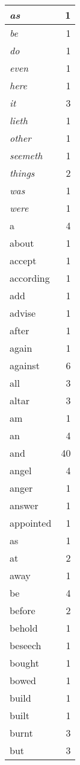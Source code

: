 \begin{center}
\begin{longtable}{l|r}
\emph{as} & 1 \\ \hline
\emph{be} & 1 \\ \hline
\emph{do} & 1 \\ \hline
\emph{even} & 1 \\ \hline
\emph{here} & 1 \\ \hline
\emph{it} & 3 \\ \hline
\emph{lieth} & 1 \\ \hline
\emph{other} & 1 \\ \hline
\emph{seemeth} & 1 \\ \hline
\emph{things} & 2 \\ \hline
\emph{was} & 1 \\ \hline
\emph{were} & 1 \\ \hline
a & 4 \\ \hline
about & 1 \\ \hline
accept & 1 \\ \hline
according & 1 \\ \hline
add & 1 \\ \hline
advise & 1 \\ \hline
after & 1 \\ \hline
again & 1 \\ \hline
against & 6 \\ \hline
all & 3 \\ \hline
altar & 3 \\ \hline
am & 1 \\ \hline
an & 4 \\ \hline
and & 40 \\ \hline
angel & 4 \\ \hline
anger & 1 \\ \hline
answer & 1 \\ \hline
appointed & 1 \\ \hline
as & 1 \\ \hline
at & 2 \\ \hline
away & 1 \\ \hline
be & 4 \\ \hline
before & 2 \\ \hline
behold & 1 \\ \hline
beseech & 1 \\ \hline
bought & 1 \\ \hline
bowed & 1 \\ \hline
build & 1 \\ \hline
built & 1 \\ \hline
burnt & 3 \\ \hline
but & 3 \\ \hline

\end{longtable}
\end{center}
